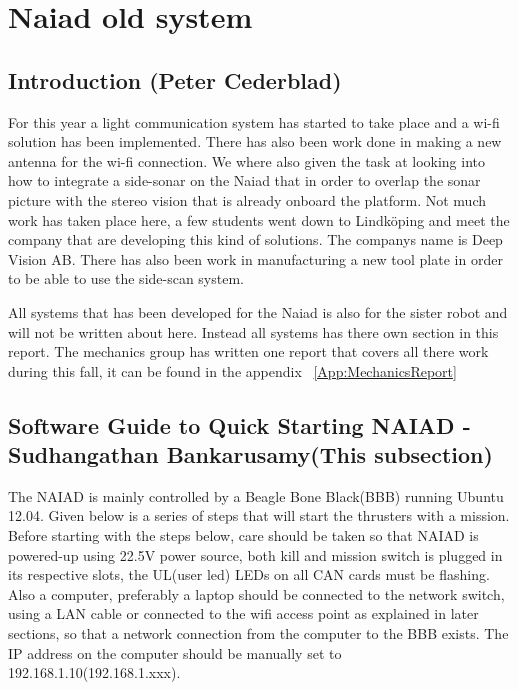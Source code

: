 

\section{Naiad old system}
\label{sec:NaiadOldSystem}


\subsection{Introduction (Peter Cederblad)}
For this year a light communication system has started to take place and a wi-fi solution has been implemented. There has also been work done in making a new antenna for the wi-fi connection.
We where also given the task at looking into how to integrate a side-sonar on the Naiad that in order to overlap the sonar picture with the stereo vision that is already onboard the platform. Not much work has taken place here, a few students went down to Lindköping and meet the company that are developing this kind of solutions. The companys name is Deep Vision AB.  There has also been work in manufacturing a new tool plate in order to be able to use the side-scan system.

All systems that has been developed for the Naiad is also for the sister robot and will not be written about here. Instead all systems has there own section in this report.
The mechanics group has written one report that covers all there work during this fall, it can be found in the appendix ~\ref{App:MechanicsReport}


\subsection{Software Guide to Quick Starting NAIAD - Sudhangathan Bankarusamy(This subsection)}
The NAIAD is mainly controlled by a Beagle Bone Black(BBB) running Ubuntu 12.04. Given below is a series of steps that will start the thrusters with a mission. Before starting with the steps below, care should be taken so that NAIAD is powered-up using 22.5V power source, both kill and mission switch is plugged in its respective slots, the UL(user led) LEDs on all CAN cards must be flashing. Also a computer, preferably a laptop should be connected to the network switch, using a LAN cable or connected to the wifi access point as explained in later sections, so that a network connection from the computer to the BBB exists. The IP address on the computer should be manually set to 192.168.1.10(192.168.1.xxx).


